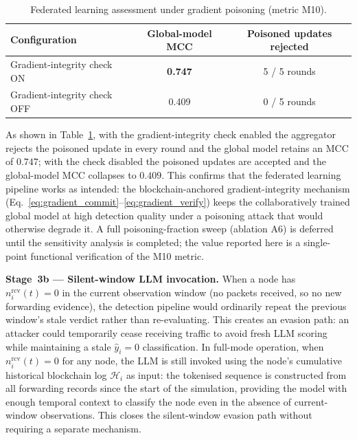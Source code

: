 \documentclass[12pt, a4paper]{report}
\newcommand{\mypar}{\vspace{0.8em}\noindent}
\begin{document}
\begin{table}[H]
\renewcommand{\arraystretch}{1.3}
\caption{Federated learning assessment under gradient poisoning (metric M10).}
\label{tab:fl_assessment}
\centering
\small
\begin{tabular}{|l|c|c|}
\hline
\textbf{Configuration} & \textbf{Global-model MCC} &
\textbf{Poisoned updates rejected} \\
\hline
Gradient-integrity check ON & \textbf{0.747} & 5 / 5 rounds \\
\hline
Gradient-integrity check OFF & 0.409 & 0 / 5 rounds \\
\hline
\end{tabular}
\end{table}

As shown in Table~\ref{tab:fl_assessment}, with the gradient-integrity check
enabled the aggregator rejects the poisoned update in every round and the global
model retains an MCC of $0.747$; with the check disabled the poisoned updates are
accepted and the global-model MCC collapses to $0.409$. This confirms that the
federated learning pipeline works as intended: the blockchain-anchored
gradient-integrity mechanism (Eq.~\eqref{eq:gradient_commit}--\eqref{eq:gradient_verify})
keeps the collaboratively trained global model at high detection quality under a
poisoning attack that would otherwise degrade it. A full poisoning-fraction sweep
(ablation A6) is deferred until the sensitivity analysis is completed; the value
reported here is a single-point functional verification of the M10 metric.

\mypar
\textbf{Stage~3b --- Silent-window LLM invocation.}
When a node has $n_i^{\mathrm{rcv}}(t)=0$ in the current observation
window (no packets received, so no new forwarding evidence), the
detection pipeline would ordinarily repeat the previous window's
stale verdict rather than re-evaluating. This creates an evasion
path: an attacker could temporarily cease receiving traffic to
avoid fresh LLM scoring while maintaining a stale
$\hat{y}_i=0$ classification. In full-mode operation, when
$n_i^{\mathrm{rcv}}(t)=0$ for any node, the LLM is still invoked
using the node's cumulative historical blockchain log
$\mathcal{H}_i$ as input: the tokenised sequence is constructed
from all forwarding records since the start of the simulation,
providing the model with enough temporal context to classify the
node even in the absence of current-window observations. This
closes the silent-window evasion path without requiring a
separate mechanism.
\end{document}
